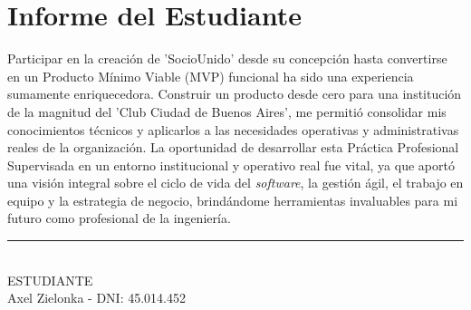 \section{Informe del Estudiante}

Participar en la creación de 'SocioUnido' desde su concepción hasta convertirse en un Producto Mínimo Viable (MVP) funcional ha sido una experiencia sumamente enriquecedora. Construir un producto desde cero para una institución de la magnitud del 'Club Ciudad de Buenos Aires', me permitió consolidar mis conocimientos técnicos y aplicarlos a las necesidades operativas y administrativas reales de la organización. La oportunidad de desarrollar esta Práctica Profesional Supervisada en un entorno institucional y operativo real fue vital, ya que aportó una visión integral sobre el ciclo de vida del \textit{software}, la gestión ágil, el trabajo en equipo y la estrategia de negocio, brindándome herramientas invaluables para mi futuro como profesional de la ingeniería.

\vspace{1.5cm}
\noindent\rule{8cm}{0.4pt} \\
ESTUDIANTE \\
Axel Zielonka - DNI: 45.014.452
